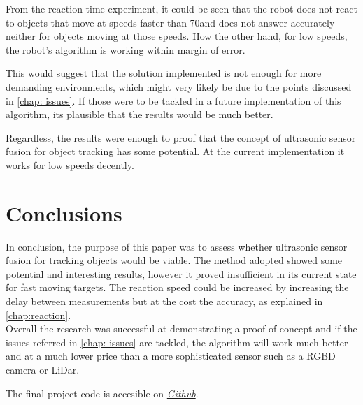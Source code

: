 \documentclass[sigconf,nonacm]{acmart}
\begin{document}
From the reaction time experiment, it could be seen that the robot does not
react to objects that move at speeds faster than 70\footnotemark[4] and does not
answer accurately neither for objects moving at those speeds. How the other
hand, for low speeds, the robot's algorithm is working within margin of error.

This would suggest that the solution implemented is not enough for more
demanding environments, which might very likely be due to the points discussed
in \autoref{chap: issues}. If those were to be tackled in a future
implementation of this algorithm, its plausible that the results would be much
better.

Regardless, the results were enough to proof that the concept of ultrasonic
sensor fusion for object tracking has some potential. At the current
implementation it works for low speeds decently\footnotemark[1].

\section{Conclusions}

In conclusion, the purpose of this paper was to assess  whether ultrasonic
sensor fusion for tracking objects would be viable. The method adopted showed
some potential and interesting results, however it proved insufficient in its
current state for fast moving targets. The reaction speed could be increased by
increasing the delay between measurements but at the cost the accuracy, as
explained in \autoref{chap:reaction}.\\

Overall the research was successful at demonstrating a proof of concept and if
the issues referred in \autoref{chap: issues} are tackled, the algorithm will
work much better and at a much lower price than a more sophisticated sensor such
as a RGBD camera or LiDar.



The final project code is accesible on \textit{\href{https://github.com/brunofavs/propeller_cath_game}{Github}}. 



\end{document}
